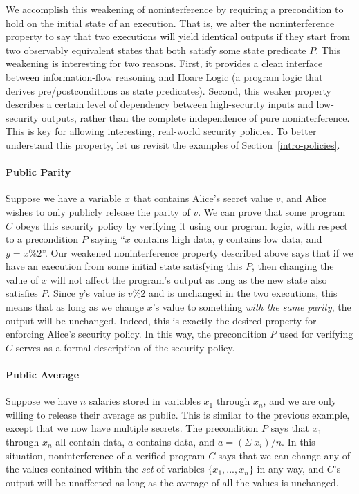 We accomplish this weakening of noninterference by
requiring a precondition to hold on the initial state of an execution. That is, we alter the 
noninterference property to say that two executions will yield identical outputs if they start from 
two observably equivalent states that both satisfy some state predicate $P$. This weakening 
is interesting for two reasons. First, it provides a clean interface between information-flow 
reasoning and Hoare Logic (a program logic that derives pre/postconditions as state predicates). 
Second, this weaker property describes a certain level of dependency between high-security inputs 
and low-security outputs, rather than the complete independence of pure noninterference. This is
key for allowing interesting, real-world security policies.
To better understand this property, let us revisit the examples of Section~\ref{intro-policies}.

\paragraph{Public Parity}
Suppose we have a variable $x$ that contains Alice's secret value $v$, and Alice wishes
to only publicly release the parity of $v$. We can prove that some program $C$ obeys this
security policy by verifying it using our program logic, with respect to a 
precondition $P$ saying ``$x$ contains high data, $y$ contains low data, and $y = x \% 2$''.
Our weakened noninterference property described above says that if we have an execution from 
some initial state satisfying this $P$,
then changing the value of $x$ will not affect the program's output as long as the new state also 
satisfies $P$. Since $y$'s value is $v\%2$ and is unchanged in the two executions, this means that 
as long as we change $x$'s value to something \emph{with the same parity}, the output will be
unchanged. Indeed, this is exactly the desired property for enforcing Alice's security policy.
In this way, the precondition $P$ used for verifying $C$ serves as a formal description of
the security policy.

\paragraph{Public Average}
Suppose we have $n$ salaries stored in variables $x_1$ through $x_n$, and we are only willing to 
release their average as public. This 
is similar to the previous example, except that we now have multiple secrets. The precondition 
$P$ says that $x_1$ through $x_n$ all contain \hi{} data, $a$ contains \lo{} data, and 
$a = (\Sigma~x_i)/n$. 
In this situation, noninterference of a verified program $C$ says that we can change any of 
the values contained within the \emph{set} 
of variables $\{x_1,...,x_n\}$ in any way, and $C$'s output will be unaffected as long as the 
average of all the values is unchanged.

